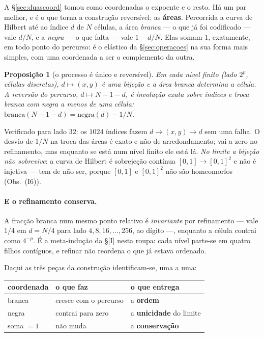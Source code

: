 \documentclass[11pt,a4paper]{article}
\theoremstyle{plain}
\newtheorem{proposicao}[teorema]{Proposição}
\theoremstyle{definition}
\theoremstyle{remark}
\begin{document}
A \S\ref{sec:duascoord} tomou como coordenadas o expoente e o resto. Há um par melhor, e é o que
torna a construção reversível: as \textbf{áreas}. Percorrida a curva de Hilbert até ao índice $d$
de $N$ células, a área \emph{branca} --- o que já foi codificado --- vale $d/N$, e a \emph{negra}
--- o que falta --- vale $1-d/N$. Elas somam $1$, exatamente, em todo ponto do percurso: é o
elástico da \S\ref{sec:operacoes} na sua forma mais simples, com uma coordenada a ser o complemento
da outra.

\begin{proposicao}[o processo é único e reversível]\label{prop:areas}
Em cada nível finito (lado $2^p$, células discretas), $d \mapsto (x,y)$ é uma bijeção e a área
branca determina a célula. A reversão do percurso, $d\mapsto N-1-d$, é involução exata sobre
índices e troca branca com negra \emph{a menos de uma célula}: $\text{branca}(N-1-d) =
\text{negra}(d) - 1/N$.
\end{proposicao}

\noindent Verificado para lado $32$: os $1024$ índices fazem $d\to(x,y)\to d$ sem uma falha. O
desvio de $1/N$ na troca das áreas é exato e não de arredondamento; vai a zero no refinamento, mas
enquanto se está num nível finito ele está lá. \emph{No limite a bijeção não sobrevive}: a curva de
Hilbert é sobrejeção contínua $[0,1]\to[0,1]^2$ e não é injetiva --- tem de não ser, porque $[0,1]$
e $[0,1]^2$ não são homeomorfos (Obs.~(I6)).

\paragraph{E o refinamento conserva.} A fracção branca num mesmo ponto relativo é \emph{invariante}
por refinamento --- vale $1/4$ em $d=N/4$ para lado $4,8,16,\dots,256$, ao dígito ---, enquanto a
célula contrai como $4^{-p}$. É a meta-indução da \S[I] nesta roupa: cada nível parte-se
em quatro filhos contíguos, e refinar não reordena o que já estava ordenado.

Daqui as três peças da construção identificam-se, uma a uma:

\begin{center}\small
\begin{tabular}{lll}
\hline
coordenada & o que faz & o que entrega \\ \hline
branca & cresce com o percurso & a \textbf{ordem} \\
negra & contrai para zero & a \textbf{unicidade} do limite \\
soma $=1$ & não muda & a \textbf{conservação} \\
\hline
\end{tabular}
\end{center}
\end{document}

